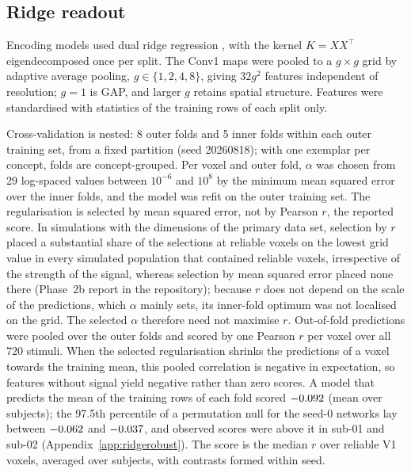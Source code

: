 \subsection{Ridge readout}
\label{app:ridge}

Encoding models used dual ridge regression \citep{hoerl1970}, with the kernel
$K = XX^{\top}$ eigendecomposed once per split. The Conv1 maps were
pooled to a $g \times g$ grid by adaptive average pooling, $g \in \{1, 2, 4, 8\}$, giving
$32g^2$ features independent of resolution; $g = 1$ is GAP, and larger $g$ retains
spatial structure. Features were standardised with statistics of the training rows of
each split only.

Cross-validation is nested: 8 outer folds and 5 inner folds within each outer training
set, from a fixed partition (seed 20260818); with one exemplar per concept, folds are
concept-grouped. Per voxel and outer fold, $\alpha$ was
chosen from 29 log-spaced values between $10^{-6}$ and $10^{8}$ by the minimum mean
squared error over the inner folds, and the model was refit on the outer training set.
The regularisation is selected by mean squared error, not by Pearson $r$, the reported score. In simulations with the dimensions of the primary data set, selection by $r$ placed a substantial share of the selections at reliable voxels on the lowest grid value in every simulated population that contained reliable voxels, irrespective of the strength of the signal, whereas selection by mean squared error placed none there (Phase~2b report in the repository); because $r$ does not depend on the scale of the predictions, which $\alpha$ mainly sets, its inner-fold optimum was not localised on the grid. The selected $\alpha$ therefore need not maximise $r$.
Out-of-fold predictions were pooled over the outer folds and scored by one Pearson $r$
per voxel over all 720 stimuli. When the selected regularisation shrinks the predictions
of a voxel towards the training mean, this pooled correlation is negative in
expectation, so features without signal yield negative rather than zero scores. A model that predicts the mean of the training rows of each fold scored $-0.092$ (mean over subjects); the 97.5th percentile of a permutation null for the seed-0 networks lay between $-0.062$ and $-0.037$, and observed scores were above it in sub-01 and sub-02 (Appendix~\ref{app:ridgerobust}). The score is the median $r$ over reliable V1 voxels,
averaged over subjects, with contrasts formed within seed.

